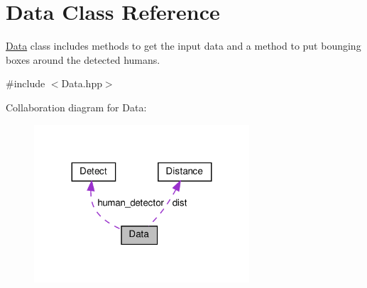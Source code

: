 \hypertarget{classData}{}\section{Data Class Reference}
\label{classData}


\hyperlink{classData}{Data} class includes methods to get the input data and a method to put bounging boxes around the detected humans.  




{\ttfamily \#include $<$Data.\+hpp$>$}



Collaboration diagram for Data\+:
\nopagebreak
\begin{figure}[H]
\begin{center}
\leavevmode
\includegraphics[width=227pt]{classData__coll__graph}
\end{center}
\end{figure}
